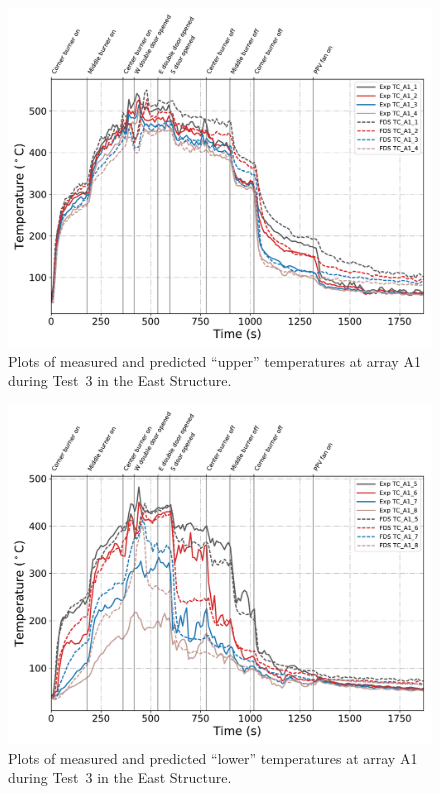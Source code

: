 \clearpage
\begin{figure}[p]
	\centering
	\includegraphics[width=\columnwidth]{Figures/Plots/Validation/Temperature/Test_3_TC_A1_upper}
	\caption{Plots of measured and predicted ``upper'' temperatures at array A1 during Test~3 in the East Structure.}
	\label{fig:TCA1_upper_data_Test3}
\end{figure}
\begin{figure}[p]
	\centering
	\includegraphics[width=\columnwidth]{Figures/Plots/Validation/Temperature/Test_3_TC_A1_lower}
	\caption{Plots of measured and predicted ``lower'' temperatures at array A1 during Test~3 in the East Structure.}
	\label{fig:TCA1_lower_data_Test3}
\end{figure}

